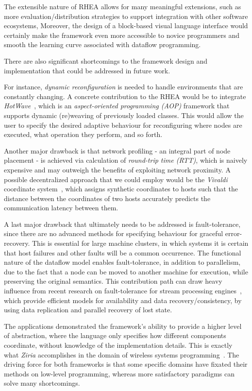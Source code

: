 \documentclass[sigplan,review,anonymous,screen]{acmart}
\begin{document}
The extensible nature of \textsc{RHEA} allows for many meaningful extensions, such as
more evaluation/distribution strategies to support integration with other software ecosystems,
Moreover, the design of a block-based visual language interface would certainly make the
framework even more accessible to novice programmers and smooth the learning curve
associated with dataflow programming.

There are also significant shortcomings to the framework design and implementation that
could be addressed in future work.

For instance, \textit{dynamic reconfiguration} is needed to handle environments that are constantly changing.
A concrete contribution to the \textsc{RHEA} would be to integrate \textit{HotWave}~\cite{reconf_java},
which is an \textit{aspect-oriented programming (AOP)} framework that supports dynamic
(re)weaving of previously loaded classes. This would allow the user to specify the desired
adaptive behaviour for reconfiguring where nodes are executed, what operation they perform, and so forth.

Another major drawback is that network profiling - an integral part of node placement - is achieved via
calculation of \textit{round-trip time (RTT)}, which is naively expensive and may outweigh the benefits of
exploiting network proximity. A possible decentralized approach that we could employ would be the \textit{Vivaldi}
coordinate system~\cite{vivaldi}, which assigns synthetic coordinates to hosts
such that the distance between the coordinates of two hosts accurately predicts
the communication latency between them.

A last major drawback that ultimately needs to be addressed is fault-tolerance,
since there are no advanced methods for specifying behaviour for graceful
error-recovery. This is essential for large machine clusters, in which systems it is
certain that host failures and other faults will be a common occurrence. The
functional nature of the dataflow model enables fault-tolerance, in addition to
parallelism, due to the fact that a node can be moved to another machine for
execution, while preserving the original semantics.  This contribution path can draw
heavy influence from recent research on fault-tolerance for stream processing engines~\cite{borealis},
which provide efficient models for availability and data recovery/consistency,
by using data replication and parallel recovery of lost state.

The applications demonstrated the framework's ability to provide a higher level
of abstraction, where the language only specifies how different components
coordinate, without knowledge of the implementation details. This is exactly
what \textit{Ziria} accomplishes in the domain of wireless systems
programming~\cite{ziria}. The driving force for both frameworks is that some
specific domains have fixated their methods on low-level programming, whereas
more satisfactory paradigms can solve many shortcomings.
\end{document}
